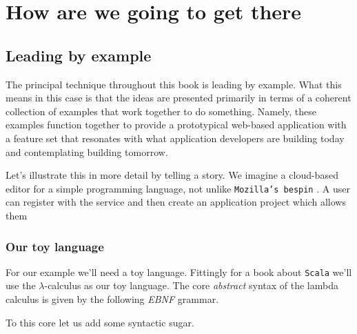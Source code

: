 \section{How are we going to get there}

\subsection{Leading by example}

The principal technique throughout this book is leading by
example. What this means in this case is that the ideas are presented
primarily in terms of a coherent collection of examples that work
together to do something. Namely, these examples function together to
provide a prototypical web-based application with a feature set that
resonates with what application developers are building today and
contemplating building tomorrow.

Let's illustrate this in more detail by telling a story. We imagine a
cloud-based editor for a simple programming language, not unlike
\texttt{Mozilla's bespin} . A user can register with the service and
then create an application project which allows them

\subsubsection{Our toy language}

For our example we'll need a toy language. Fittingly for a book about
\texttt{Scala} we'll use the $\lambda$-calculus as our toy
language. The core \textit{abstract} syntax of the lambda calculus is
given by the following \textit{EBNF} grammar.


To this core let us add some syntactic sugar.

